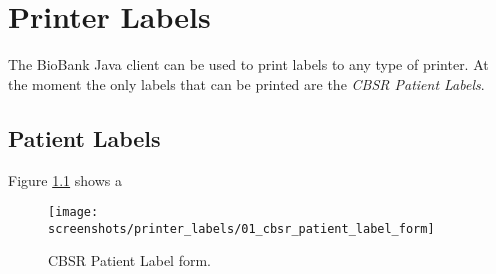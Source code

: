 \chapter{Printer Labels}
\label{chap:printer_labels}

The BioBank Java client can be used to print labels to any type of printer. At
the moment the only labels that can be printed are the \emph{CBSR Patient
  Labels}.

\section{Patient Labels}
\label{sec:printer_labels}

Figure \ref{fig:cbsr_patient_label} shows a

    \begin{figure}[H]
      \centering
      \scalebox{0.3}
      { \texttt{[image: screenshots/printer\_labels/01\_cbsr\_patient\_label\_form]} }
      \caption{CBSR Patient Label form.}
      \label{fig:cbsr_patient_label}
    \end{figure}
